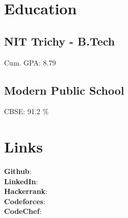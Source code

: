\documentclass[]{deedy-resume-openfont}
\begin{document}
\lastupdated


\begin{minipage}[t]{0.30\textwidth}

\section{Education}

\subsection{NIT Trichy - B.Tech}
Cum. GPA: 8.79 \\
\sectionsep

\subsection{Modern Public School}
CBSE: 91.2 \% \\


\section{Links}
\textbf{Github}: \href{https://github.com/adityaa30}{} \\
\textbf{LinkedIn}: \href{https://www.linkedin.com/in/adityaa30/}{} \\
\textbf{Hackerrank}: \href{https://www.hackerrank.com/adityaa30?hr_r=1}{} \\
\textbf{Codeforces}: \href{https://codeforces.com/profile/adityaa30}{} \\
\textbf{CodeChef}: \href{https://www.codechef.com/users/adityaa30}{}


\end{minipage}
\end{document}
